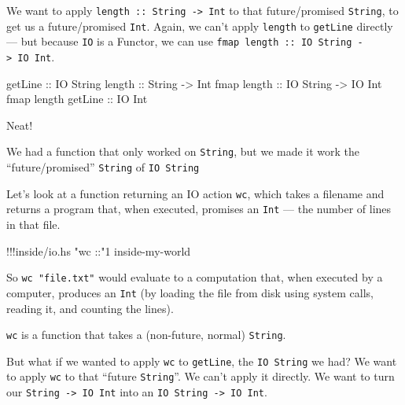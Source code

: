 \documentclass[]{article}
\newenvironment{Shaded}{}{}
\newcommand{\DataTypeTok}[1]{\textcolor[rgb]{0.56,0.13,0.00}{{#1}}}
\newcommand{\DecValTok}[1]{\textcolor[rgb]{0.25,0.63,0.44}{{#1}}}
\newcommand{\StringTok}[1]{\textcolor[rgb]{0.25,0.44,0.63}{{#1}}}
\newcommand{\OtherTok}[1]{\textcolor[rgb]{0.00,0.44,0.13}{{#1}}}
\newcommand{\FunctionTok}[1]{\textcolor[rgb]{0.02,0.16,0.49}{{#1}}}
\newcommand{\NormalTok}[1]{{#1}}
\begin{document}
We want to apply \texttt{length\ ::\ String\ -\textgreater{}\ Int} to
that future/promised \texttt{String}, to get us a future/promised
\texttt{Int}. Again, we can't apply \texttt{length} to \texttt{getLine}
directly --- but because \texttt{IO} is a Functor, we can use
\texttt{fmap\ length\ ::\ IO\ String\ -\textgreater{}\ IO\ Int}.

\begin{Shaded}
\begin{Highlighting}[]
\NormalTok{getLine}\OtherTok{             ::} \DataTypeTok{IO} \DataTypeTok{String}
\NormalTok{length}\OtherTok{              ::} \DataTypeTok{String} \OtherTok{->} \DataTypeTok{Int}
\NormalTok{fmap}\OtherTok{ length         ::} \DataTypeTok{IO} \DataTypeTok{String} \OtherTok{->} \DataTypeTok{IO} \DataTypeTok{Int}
\NormalTok{fmap length}\OtherTok{ getLine ::} \DataTypeTok{IO} \DataTypeTok{Int}
\end{Highlighting}
\end{Shaded}

Neat!

We had a function that only worked on \texttt{String}, but we made it
work the ``future/promised'' \texttt{String} of \texttt{IO\ String}

Let's look at a function returning an IO action \texttt{wc}, which takes
a filename and returns a program that, when executed, promises an
\texttt{Int} --- the number of lines in that file.

\begin{Shaded}
\begin{Highlighting}[]
\FunctionTok{!!!}\NormalTok{inside}\FunctionTok{/}\NormalTok{io}\FunctionTok{.}\NormalTok{hs }\StringTok{"wc ::"}\DecValTok{1} \NormalTok{inside}\FunctionTok{-}\NormalTok{my}\FunctionTok{-}\NormalTok{world}
\end{Highlighting}
\end{Shaded}

So \texttt{wc\ "file.txt"} would evaluate to a computation that, when
executed by a computer, produces an \texttt{Int} (by loading the file
from disk using system calls, reading it, and counting the lines).

\texttt{wc} is a function that takes a (non-future, normal)
\texttt{String}.

But what if we wanted to apply \texttt{wc} to \texttt{getLine}, the
\texttt{IO\ String} we had? We want to apply \texttt{wc} to that
``future \texttt{String}''. We can't apply it directly. We want to turn
our \texttt{String\ -\textgreater{}\ IO\ Int} into an
\texttt{IO\ String\ -\textgreater{}\ IO\ Int}.
\end{document}
